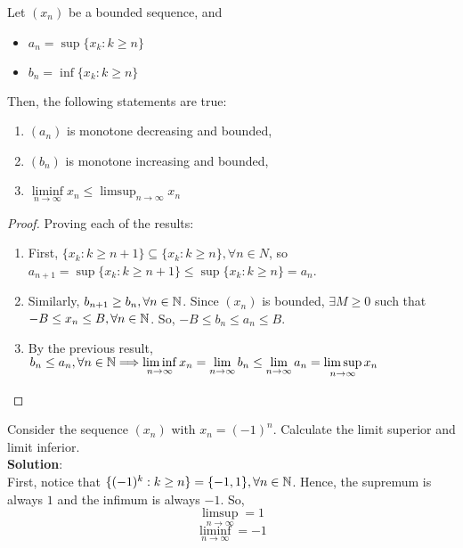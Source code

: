\begin{theorem}
    Let $(x_n)$ be a bounded sequence, and
    \begin{itemize}
        \item $a_n = \sup\{x_k: k \geq n\}$
        \item $b_n = \inf\{x_k: k \geq n\}$
    \end{itemize}
    Then, the following statements are true:
    \begin{enumerate}
        \item $(a_n)$ is monotone decreasing and bounded,
        \item $(b_n)$ is monotone increasing and bounded,
        \item $\liminf \limits_{n\to \infty} x_n \leq \limsup_{n \to \infty} x_n$
    \end{enumerate}
\end{theorem}

\begin{proof}
    Proving each of the results:
    \begin{enumerate}
        \item First, $\{x_k:k \geq n+1\} \subseteq \{x_k: k \geq n\}, \forall n \in N$, so $a_{n+1} = \sup \{x_k: k \geq n+1\} \leq \sup \{x_k: k \geq n\} = a_n$.
        \item Similarly, $b_{n+1} \geq b_n, \forall n \in \mathbb{N}$. Since $(x_n)$ is bounded, $\exists M \geq 0$ such that $-B \leq x_n \leq B, \forall n \in \mathbb{N}$. So, $-B \leq b_n \leq a_n \leq B$.
        \item By the previous result, $b_n \leq a_n, \forall n \in \mathbb{N} \Longrightarrow \liminf \limits_{n \to \infty} x_n = \lim \limits_{n \to \infty} b_n \leq \lim \limits_{n \to \infty} a_n = \limsup \limits_{n \to \infty} x_n$
    \end{enumerate}
\end{proof}

\begin{eg}
    Consider the sequence $(x_n)$ with $x_n=(-1)^n$. Calculate the limit superior and limit inferior.\\
    \textbf{Solution}: \\
    First, notice that $\{ (-1)^k: k \geq n\} = \{-1, 1\}, \forall n \in \mathbb{N}$. Hence, the supremum is always $1$ and the infimum is always $-1$. So,
    \begin{equation*}
        \limsup \limits_{n \to \infty} = 1
    \end{equation*}
    \begin{equation*}
        \liminf \limits_{n \to \infty} = -1
    \end{equation*}
\end{eg}



